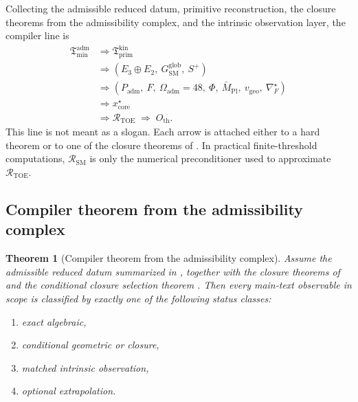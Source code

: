 \documentclass[11pt,a4paper]{article}
\newtheorem{theorem}{Theorem}[section]
\theoremstyle{definition}
\theoremstyle{remark}
\newcommand{\Mpl}{\bar M_{\mathrm{Pl}}}
\newcommand{\SM}{\mathrm{SM}}
\newcommand{\Oadm}{\Omega_{\mathrm{adm}}}
\newcommand{\Tmin}{\mathfrak T_{\mathrm{min}}}
\newcommand{\Tprim}{\mathfrak T_{\mathrm{prim}}}
\newcommand{\vgeo}{v_{\mathrm{geo}}}
\newcommand{\Padm}{P_{\mathrm{adm}}}
\begin{document}
Collecting the admissible reduced datum, primitive reconstruction, the closure theorems from the
admissibility complex, and the intrinsic observation layer, the compiler line is
\begin{equation}
\label{eq:closed-compiler-chain}
\begin{aligned}
\Tmin^{\mathrm{adm}}
&\Rightarrow
\Tprim^{\mathrm{kin}}\\
&\Rightarrow
(E_3\oplus E_2,\ G_{\SM}^{\mathrm{glob}},\ S^+)\\
&\Rightarrow
(\Padm,\ F,\ \Oadm=48,\ \Phi,\ \Mpl,\ \vgeo,\ \nabla_F^\star)\\
&\Rightarrow
x_{\mathrm{core}}^\star\\
&\Rightarrow
\mathcal R_{\mathrm{TOE}}
\;\Rightarrow\;
O_{\mathrm{th}}.
\end{aligned}
\end{equation}
This line is not meant as a slogan. Each arrow is attached either to a hard theorem or to one of
the closure theorems of . In practical finite-threshold computations,
$\mathcal R_{\SM}$ is only the numerical preconditioner used to approximate
$\mathcal R_{\mathrm{TOE}}$.

\subsection{Compiler theorem from the admissibility complex}

\begin{theorem}[Compiler theorem from the admissibility complex]
Assume the admissible reduced datum summarized in , together with the
closure theorems of  and the conditional closure selection theorem
. Then every main-text observable in scope is classified by
exactly one of the following status classes:
\begin{enumerate}[label=(\roman*), leftmargin=1.5em, topsep=3pt, itemsep=2pt]
    \item exact algebraic,
    \item conditional geometric or closure,
    \item matched intrinsic observation,
    \item optional extrapolation.
\end{enumerate}
\end{theorem}
\end{document}
